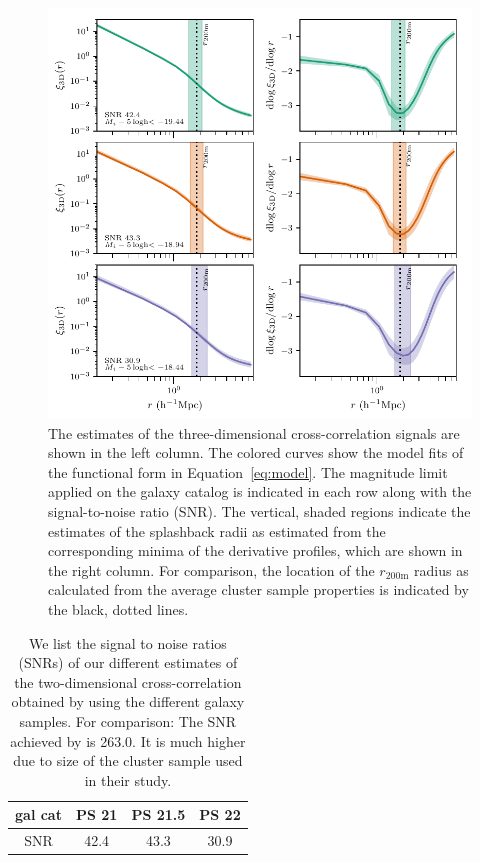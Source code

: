 \documentclass[iop, apjl, twocolappendix, numberedappendix]{emulateapj}
\begin{document}
\begin{figure}
    \includegraphics[scale=0.65]{3D_graphs.pdf}
\caption{The estimates of the three-dimensional cross-correlation
signals are shown in the left column. The colored curves show the
model fits of the functional form in Equation~\ref{eq:model}. The magnitude
limit applied on the galaxy catalog is indicated in each row along with 
the signal-to-noise ratio (SNR). The vertical, shaded regions indicate the 
estimates of the splashback radii as estimated from the corresponding minima 
of the derivative profiles, which are shown in the right column. For comparison, 
the location of the $r_{\mathrm{200m}}$ radius as calculated from the
average cluster sample properties is indicated by the black, dotted
lines.}
   \label{fig:3D_graphs} 
\end{figure}


\begin{table}
    \centering
    \caption{We list the signal to noise ratios (SNRs) of our
different estimates of the two-dimensional cross-correlation
obtained by using the different galaxy samples. For comparison: The SNR
achieved by \citet{more2016detection} is 263.0. It is much higher
due to size of the cluster sample used in their study.}
    \label{tab:snr}
    \begin{tabular}{cccc}
    \hline
    gal cat & PS 21 & PS 21.5 & PS 22 \\ 
    \hline
    \hline
   SNR & 42.4 & 43.3 & 30.9 \\
    \hline
    \end{tabular} 
\end{table}
\end{document}
